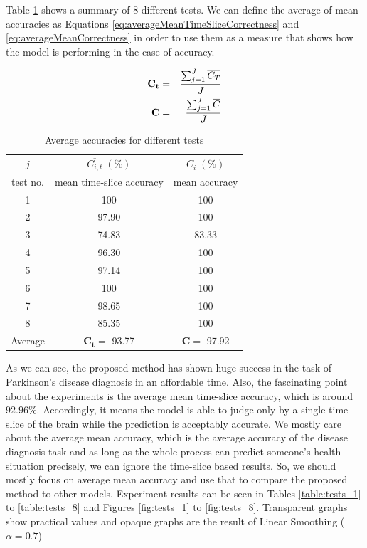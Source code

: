\documentclass[preprint,12pt]{elsarticle}
\begin{document}
Table \ref{table:averageAccuracies} shows a summary of 8 different tests. We can define the average of mean accuracies as Equations \eqref{eq:averageMeanTimeSliceCorrectness} and \eqref{eq:averageMeanCorrectness} in order to use them as a measure that shows how the model is performing in the case of accuracy. 

\begin{eqnarray}
\label{eq:averageMeanTimeSliceCorrectness}
\mathbf{C_t} &=& {{\sum_{j=1}^{J} \overline{C_{T}} } \over {J} } \\ 
\label{eq:averageMeanCorrectness}
\mathbf{C} &=& {{\sum_{j=1}^{J} \overline{C} } \over {J} } 
\end{eqnarray}


\begin{table}
	\caption{Average accuracies for different tests}
	\centering
	\begin{tabular}{| c | c | c| }
		\hline
		$j$ & $\overline{C_{i,t}}\;(\%)$ & $\overline{C_i}\;(\%)$ \\ 
		test no. & mean time-slice accuracy & mean accuracy \\ \hline
		1 & 100 & 100 \\
		2 & 97.90 & 100 \\
		3 & 74.83 & 83.33 \\
		4 & 96.30 & 100 \\
		5 & 97.14 & 100 \\
		6 & 100 & 100 \\
		7 & 98.65 & 100 \\
		8 & 85.35 & 100 \\ \hline
		Average & $\mathbf{C_t} = $ 93.77 & $\mathbf{C} = $ 97.92 \\
		\hline
	\end{tabular}
\label{table:averageAccuracies}
\end{table}

As we can see, the proposed method has shown huge success in the task of Parkinson's disease diagnosis in an affordable time. Also, the fascinating point about the experiments is the average mean time-slice accuracy, which is around $92.96\%$. Accordingly, it means the model is able to judge only by a single time-slice of the brain while the prediction is acceptably accurate. We mostly care about the average mean accuracy, which is the average accuracy of the disease diagnosis task and as long as the whole process can predict someone's health situation precisely, we can ignore the time-slice based results. So, we should mostly focus on average mean accuracy and use that to compare the proposed method to other models. Experiment results can be seen in Tables \ref{table:tests_1} to \ref{table:tests_8} and Figures \ref{fig:tests_1} to  \ref{fig:tests_8}. Transparent graphs show practical values and opaque graphs are the result of Linear Smoothing ($\alpha = 0.7$)
\end{document}

